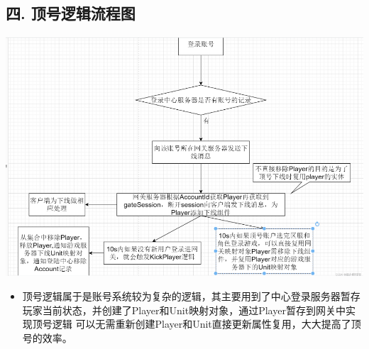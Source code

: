 \documentclass[9pt, b5paper]{article}
\begin{document}
\subsection{四. 顶号逻辑流程图}
\label{sec-3-4}

\includegraphics[width=.9\linewidth]{./pic/readme_20230124_104006.png}
\begin{itemize}
\item ​顶号逻辑属于是账号系统较为复杂的逻辑，其主要用到了中心登录服务器暂存玩家当前状态，并创建了Player和Unit映射对象，通过Player暂存到网关中实现顶号逻辑 可以无需重新创建Player和Unit直接更新属性复用，大大提高了顶号的效率。
\end{itemize}
\end{document}

